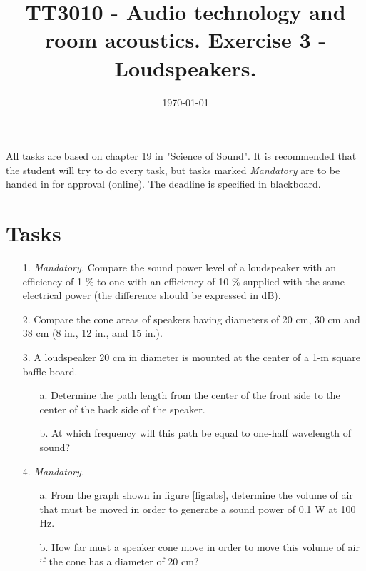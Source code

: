 \documentclass{article}
\title{TT3010 - Audio technology and room acoustics. \newline Exercise 3 - Loudspeakers.}
\date{\today}
\begin{document}
\maketitle

All tasks are based on chapter 19 in "Science of Sound". It is recommended that the student will try to do every task, but tasks marked \textit{Mandatory} are to be handed in for approval (online). The deadline is specified in blackboard.

\section*{Tasks}
\begin{itemize}
    \item [1.] \textit{Mandatory.} Compare the sound power level of a loudspeaker with an efficiency of 1 \% to one with an efficiency of 10 \% supplied with the same electrical power (the difference should be expressed in dB).
        
    \item[2.] Compare the cone areas of speakers having diameters of 20 cm, 30 cm and 38 cm (8 in., 12 in., and 15 in.).  
        
    \item[3.] A loudspeaker 20 cm in diameter is mounted at the center of a 1-m square baffle board.
    
    \begin{itemize}
        \item [a.] Determine the path length from the center of the front side to the center of the back side of the speaker.
        \item [b.] At which frequency will this path be equal to one-half wavelength of sound?
    \end{itemize}
    
    \item[4.] \textit{Mandatory.}
    \begin{itemize}
        \item [a.] From the graph shown in figure \ref{fig:abs}, determine the volume of air that must be moved in order to generate a sound power of 0.1 W at 100 Hz.
        \item [b.] How far must a speaker cone move in order to move this volume of air if the cone has a diameter of 20 cm?
    \end{itemize}
    
        

\end{itemize}
\end{document}
